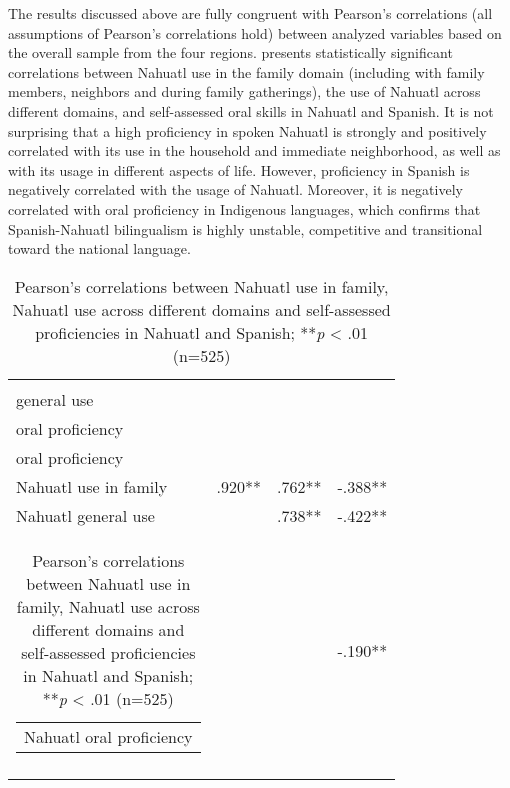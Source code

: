 \documentclass[output=paper,hidelinks]{langscibook}
\begin{document}
The results discussed above are fully congruent with Pearson’s correlations (all assumptions of Pearson’s correlations hold) between analyzed variables based on the overall sample from the four regions.  presents statistically significant correlations between Nahuatl use in the family domain (including with family members, neighbors and during family gatherings), the use of Nahuatl across different domains, and self-assessed oral skills in Nahuatl and Spanish. It is not surprising that a high proficiency in spoken Nahuatl is strongly and positively correlated with its use in the household and immediate neighborhood, as well as with its usage in different aspects of life. However, proficiency in Spanish is negatively correlated with the usage of Nahuatl. Moreover, it is negatively correlated with oral proficiency in Indigenous languages, which confirms that Spanish-Nahuatl bilingualism is highly unstable, competitive and transitional toward the national language.

\begin{table}
\begin{tabularx}{\textwidth}{llll}
\lsptoprule
                                                                   & \begin{tabular}[c]{@{}l@{}}Nahuatl\\ general use\end{tabular} & \begin{tabular}[c]{@{}l@{}}Nahuatl\\ oral proficiency\end{tabular} & \begin{tabular}[c]{@{}l@{}}Spanish\\ oral proficiency\end{tabular} \\ \hline
Nahuatl use in family                                              & .920**                                                          & .762**                                                               & -.388**                                                              \\
Nahuatl general use                                                &                                                                 & .738**                                                               & -.422**                                                              \\
\begin{tabular}[c]{@{}l@{}}Nahuatl oral proficiency\end{tabular} &                                                                 &                                                                      & -.190**                                                              \\
\lspbottomrule
\end{tabularx}
\caption{\label{tab:olko:4}Pearson’s correlations between Nahuatl use in family, Nahuatl use across different domains and self-assessed proficiencies in Nahuatl and Spanish; **\textit{p} < .01 (n=525)}
\end{table}
\end{document}
